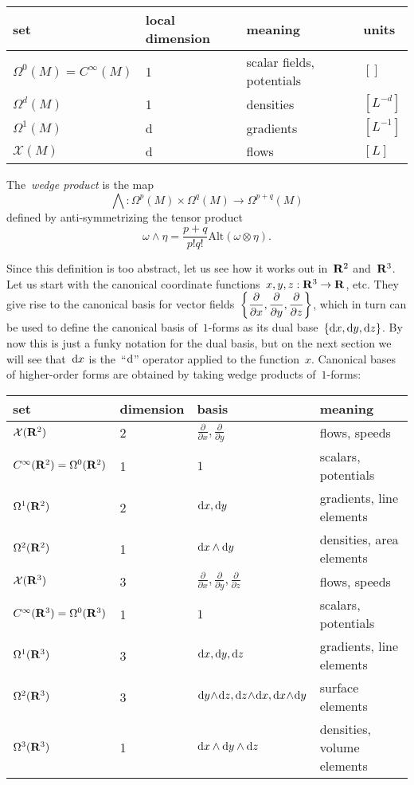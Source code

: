 \begin{tabular}{l|l|l|l}
	set & local dimension & meaning & units \\
	\hline
	$\Omega^0(M)=C^\infty(M)$ & 1 & scalar fields, potentials & $[]$ \\
	$\Omega^d(M)$ & 1 & densities & $[L^{-d}]$ \\
	$\Omega^1(M)$ & d & gradients & $[L^{-1}]$ \\
	$\mathcal{X}(M)$ & d& flows & $[L]$ \\
\end{tabular}

The~\emph{wedge product} is the map
\[
	\bigwedge:\Omega^p(M)\times\Omega^q(M)\to\Omega^{p+q}(M)
\]
defined by anti-symmetrizing the tensor product
\[
	\omega\wedge\eta=\frac{p+q}{p!q!}\mathrm{Alt}(\omega\otimes\eta).
\]

Since this definition is too abstract, let us see how it works out in~$\mathbf{R}^2$
and~$\mathbf{R}^3$.  Let us start with the canonical coordinate
functions~$x,y,z:\mathbf{R}^3\to\mathbf{R}$, etc.  They give rise to the canonical basis for
vector fields~$\displaystyle\left\{
	\frac\partial{\partial x},
	\frac\partial{\partial y},
	\frac\partial{\partial z}
\right\}
$, which in turn can be used to define the canonical basis of~$1$-forms as
its dual base~$\left\{\mathrm{d} x, \mathrm{d} y, \mathrm{d} z\right\}$.  By now this is just a
funky notation for the dual basis, but on the next section we will see
that~$\mathrm{d} x$ is the~``$\mathrm{d}$'' operator applied to the function~$x$.
Canonical bases of higher-order forms are obtained by taking wedge products
of~$1$-forms:

\begin{tabular}{l|l|l|l}
	set & dimension & basis & meaning \\
	\hline
	$\mathcal{X}(\mathbf{R}^2)$ & 2 &
	$\frac\partial{\partial x}, \frac\partial{\partial y}$ &
	flows, speeds \\
	$C^\infty(\mathbf{R}^2)=\Omega^0(\mathbf{R}^2)$ & 1 & $1$ & scalars, potentials\\
	$\Omega^1(\mathbf{R}^2)$ & 2 & $\mathrm{d} x, \mathrm{d} y$ & gradients, line elements\\
	$\Omega^2(\mathbf{R}^2)$ & 1 & $\mathrm{d} x\wedge \mathrm{d} y$ & densities, area elements\\
	\hline
	$\mathcal{X}(\mathbf{R}^3)$ & 3 &
	$\frac\partial{\partial x}, \frac\partial{\partial y},
	\frac\partial{\partial z}$ & flows, speeds\\
	$C^\infty(\mathbf{R}^3)=\Omega^0(\mathbf{R}^3)$ & 1 & $1$ & scalars, potentials\\
	$\Omega^1(\mathbf{R}^3)$ & 3 & $\mathrm{d} x, \mathrm{d} y, \mathrm{d} z$ & gradients, line elements\\
	$\Omega^2(\mathbf{R}^3)$ & 3 &
	$\mathrm{d} y\!\wedge\!\mathrm{d} z, \mathrm{d} z\!\wedge\!\mathrm{d} x, \mathrm{d} x\!\wedge\!\mathrm{d}
	y$ & surface elements\\
	$\Omega^3(\mathbf{R}^3)$ & 1 & $\mathrm{d} x\wedge\mathrm{d} y\wedge\mathrm{d} z$ & densities, volume
	elements\\
\end{tabular}

